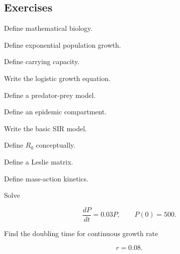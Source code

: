 \subsection{Exercises}
\label{subsec:mathematical-biology-exercises}

\begin{exercise}[1]
Define mathematical biology.
\end{exercise}

\begin{exercise}[1]
Define exponential population growth.
\end{exercise}

\begin{exercise}[1]
Define carrying capacity.
\end{exercise}

\begin{exercise}[1]
Write the logistic growth equation.
\end{exercise}

\begin{exercise}[1]
Define a predator-prey model.
\end{exercise}

\begin{exercise}[1]
Define an epidemic compartment.
\end{exercise}

\begin{exercise}[1]
Write the basic SIR model.
\end{exercise}

\begin{exercise}[1]
Define \(R_0\) conceptually.
\end{exercise}

\begin{exercise}[1]
Define a Leslie matrix.
\end{exercise}

\begin{exercise}[1]
Define mass-action kinetics.
\end{exercise}

\begin{exercise}[2]
Solve

\[
\frac{dP}{dt}=0.03P,
\qquad
P(0)=500.
\]
\end{exercise}

\begin{exercise}[2]
Find the doubling time for continuous growth rate

\[
r=0.08.
\]
\end{exercise}

